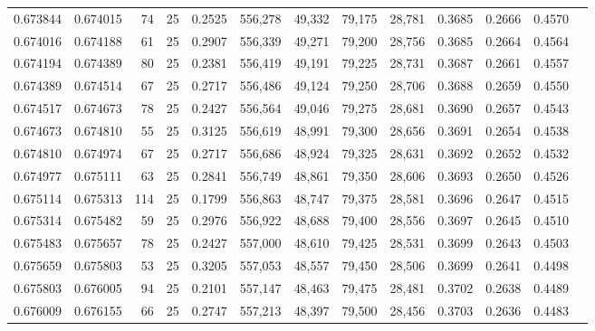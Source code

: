 \begin{tabular}{rrrrrrrrrrrrr}
0.673844 & 0.674015 &    74 &  25 &                                     0.2525 & 556,278 &  49,332 &  79,175 &  28,781 & 0.3685 & 0.2666 & 0.4570 \\
0.674016 & 0.674188 &    61 &  25 &                                     0.2907 & 556,339 &  49,271 &  79,200 &  28,756 & 0.3685 & 0.2664 & 0.4564 \\
0.674194 & 0.674389 &    80 &  25 &                                     0.2381 & 556,419 &  49,191 &  79,225 &  28,731 & 0.3687 & 0.2661 & 0.4557 \\
0.674389 & 0.674514 &    67 &  25 &                                     0.2717 & 556,486 &  49,124 &  79,250 &  28,706 & 0.3688 & 0.2659 & 0.4550 \\
0.674517 & 0.674673 &    78 &  25 &                                     0.2427 & 556,564 &  49,046 &  79,275 &  28,681 & 0.3690 & 0.2657 & 0.4543 \\
0.674673 & 0.674810 &    55 &  25 &                                     0.3125 & 556,619 &  48,991 &  79,300 &  28,656 & 0.3691 & 0.2654 & 0.4538 \\
0.674810 & 0.674974 &    67 &  25 &                                     0.2717 & 556,686 &  48,924 &  79,325 &  28,631 & 0.3692 & 0.2652 & 0.4532 \\
0.674977 & 0.675111 &    63 &  25 &                                     0.2841 & 556,749 &  48,861 &  79,350 &  28,606 & 0.3693 & 0.2650 & 0.4526 \\
0.675114 & 0.675313 &   114 &  25 &                                     0.1799 & 556,863 &  48,747 &  79,375 &  28,581 & 0.3696 & 0.2647 & 0.4515 \\
0.675314 & 0.675482 &    59 &  25 &                                     0.2976 & 556,922 &  48,688 &  79,400 &  28,556 & 0.3697 & 0.2645 & 0.4510 \\
0.675483 & 0.675657 &    78 &  25 &                                     0.2427 & 557,000 &  48,610 &  79,425 &  28,531 & 0.3699 & 0.2643 & 0.4503 \\
0.675659 & 0.675803 &    53 &  25 &                                     0.3205 & 557,053 &  48,557 &  79,450 &  28,506 & 0.3699 & 0.2641 & 0.4498 \\
0.675803 & 0.676005 &    94 &  25 &                                     0.2101 & 557,147 &  48,463 &  79,475 &  28,481 & 0.3702 & 0.2638 & 0.4489 \\
0.676009 & 0.676155 &    66 &  25 &                                     0.2747 & 557,213 &  48,397 &  79,500 &  28,456 & 0.3703 & 0.2636 & 0.4483 \\

\end{tabular}
